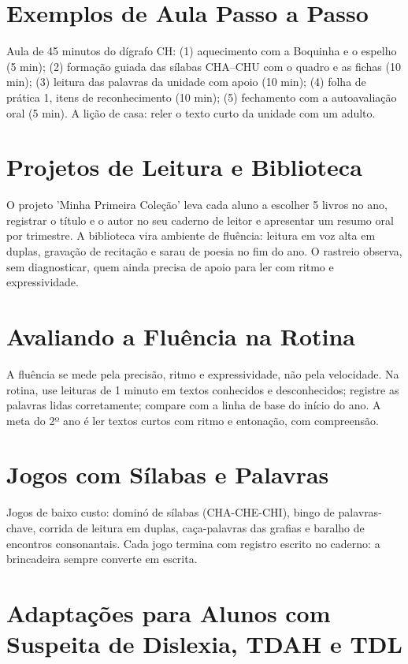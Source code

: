 \chapter{Exemplos de Aula Passo a Passo}

Aula de 45 minutos do dígrafo CH: (1) aquecimento com a Boquinha e o espelho (5 min); (2) formação guiada das sílabas CHA–CHU com o quadro e as fichas (10 min); (3) leitura das palavras da unidade com apoio (10 min); (4) folha de prática 1, itens de reconhecimento (10 min); (5) fechamento com a autoavaliação oral (5 min). A lição de casa: reler o texto curto da unidade com um adulto.


\chapter{Projetos de Leitura e Biblioteca}

O projeto 'Minha Primeira Coleção' leva cada aluno a escolher 5 livros no ano, registrar o título e o autor no seu caderno de leitor e apresentar um resumo oral por trimestre. A biblioteca vira ambiente de fluência: leitura em voz alta em duplas, gravação de recitação e sarau de poesia no fim do ano. O rastreio observa, sem diagnosticar, quem ainda precisa de apoio para ler com ritmo e expressividade.


\chapter{Avaliando a Fluência na Rotina}

A fluência se mede pela precisão, ritmo e expressividade, não pela velocidade. Na rotina, use leituras de 1 minuto em textos conhecidos e desconhecidos; registre as palavras lidas corretamente; compare com a linha de base do início do ano. A meta do 2º ano é ler textos curtos com ritmo e entonação, com compreensão.


\chapter{Jogos com Sílabas e Palavras}

Jogos de baixo custo: dominó de sílabas (CHA-CHE-CHI), bingo de palavras-chave, corrida de leitura em duplas, caça-palavras das grafias e baralho de encontros consonantais. Cada jogo termina com registro escrito no caderno: a brincadeira sempre converte em escrita.


\chapter{Adaptações para Alunos com Suspeita de Dislexia, TDAH e TDL}


